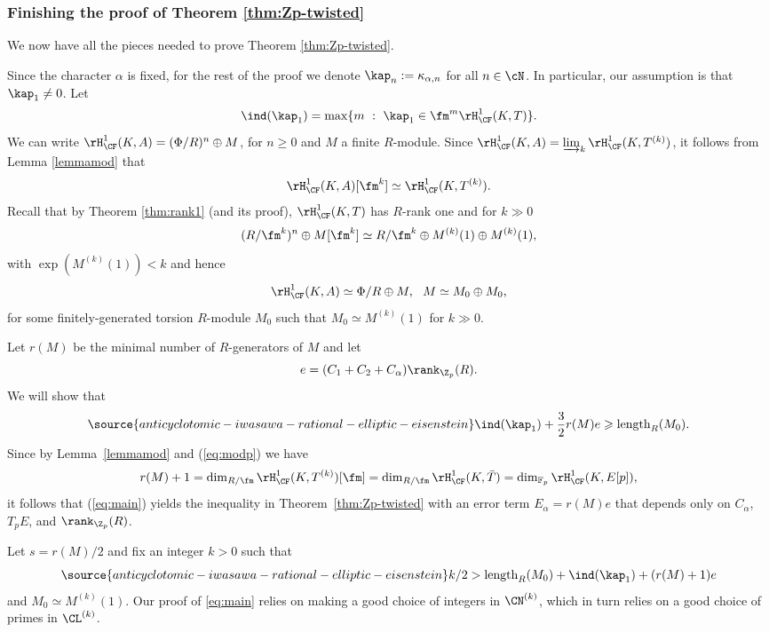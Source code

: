 \subsubsection{Finishing the proof of Theorem \ref{thm:Zp-twisted}}
We now have all the pieces needed to prove Theorem \ref{thm:Zp-twisted}.

Since the character $\alpha$ is fixed, for the rest of the proof we denote $\kap_{n}:=\kappa_{\alpha,n}$ for all $n\in\cN$. In particular, our assumption is that $\kap_1\neq 0$. Let
$$
\ind(\kap_1) = \max\{m \ : \ \kap_1\in \fm^m\rH^1_\CF(K,T)\}.
$$
We can write $\rH^1_\CF(K,A)=(\Phi/R)^n \oplus M$, for $n\geq 0$ and $M$ a finite $R$-module.
Since $\rH^1_\CF(K,A) = \varinjlim_k \rH^1_\CF(K,T^{(k)})$, it follows from Lemma \ref{lemmamod} that
\begin{displaymath}
\rH^1_\CF(K,A)[\fm^k] \simeq \rH^1_\CF(K,T^{(k)}).
\end{displaymath}
Recall that by Theorem \ref{thm:rank1} (and its proof),
$\rH^1_\CF(K,T)$ has $R$-rank one and for $k\gg 0$
\begin{displaymath}
(R/\fm^k)^n \oplus M[\fm^k]\simeq R/\fm^k \oplus M^{(k)}(1) \oplus M^{(k)}(1),
\end{displaymath}
with $\exp(M^{(k)}(1))< k$
and hence
$$
\rH^1_\CF(K,A) \simeq \Phi/R \oplus M, \ \ M \simeq M_0\oplus M_0,
$$
for some finitely-generated torsion $R$-module $M_0$ such that $M_0\simeq M^{(k)}(1)$ for $k\gg 0$.

Let $r(M)$ be the minimal number of $R$-generators of $M$ and let
\[
e = (C_1+C_2 + C_\alpha)\rank_{\Z_p}(R).
\]
We will show that
\begin{equation}\label{eq:main}
\source{anticyclotomic-iwasawa-rational-elliptic-eisenstein}
\ind(\kap_1)+\frac{3}{2}r(M)e \geqslant \mathrm{length}_R(M_0).
\end{equation}
Since by Lemma~\ref{lemmamod} and (\ref{eq:modp}) we have
\begin{displaymath}
r(M)+1=\dim_{R/\fm} \rH^1_\CF(K,T^{(k)})[\fm] =\dim_{R/\fm} \rH^1_\CF(K,\bar{T})=\dim_{\mathbb{F}_p} \rH^1_\CF(K,E[p]),
\end{displaymath}
it follows that (\ref{eq:main}) yields the inequality in Theorem~\ref{thm:Zp-twisted} with an error term $E_\alpha=r(M)e$
that depends only on $C_{\alpha}$, $T_pE$, and $\rank_{\Z_p}(R)$.

Let $s=r(M)/2$ and fix an integer $k>0$ such that
\begin{equation}\label{eq:kbig}
\source{anticyclotomic-iwasawa-rational-elliptic-eisenstein}
k/2 > \mathrm{length}_R(M_0) + \ind(\kap_1) + (r(M)+1)e
\end{equation}
and $M_0\simeq M^{(k)}(1)$.
Our proof of \eqref{eq:main} relies on making a good choice of integers in $\CN^{(k)}$, which in turn relies on a good choice
of primes in $\CL^{(k)}$.

